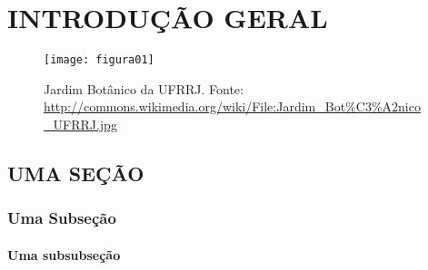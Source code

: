 \setcounter{page}{1}
\artigofalse
\chapter{INTRODUÇÃO GERAL}
\label{chap:introduction}

\blindtext[2]

\begin{figure}[!ht]
\label{fig:jardim}
\centering
\texttt{[image: figura01]}
\caption[Jardim Botânico da UFRRJ.]{Jardim Botânico da UFRRJ. Fonte: 
\url{http://commons.wikimedia.org/wiki/File:Jardim_Bot\%C3\%A2nico_UFRRJ.jpg}}
\end{figure}

\blindtext[1]

\section{UMA SEÇÃO}

\blindtext[2]

\subsection{Uma Subseção}

\blindtext[2]

\subsubsection{Uma subsubseção}

\blindtext[2]
